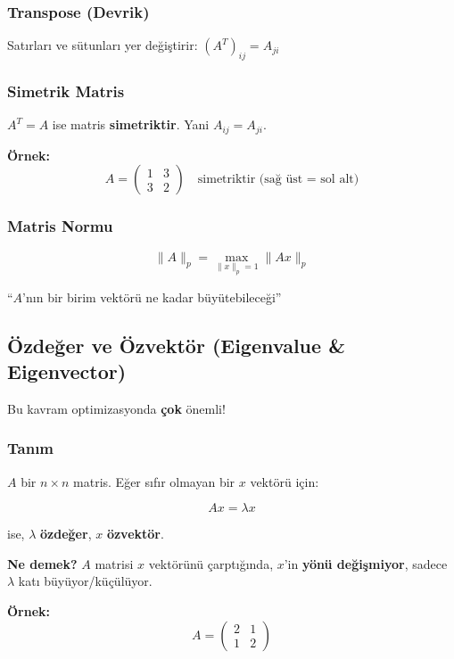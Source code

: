 \documentclass[12pt,a4paper]{article}
\theoremstyle{definition}
\theoremstyle{remark}
\begin{document}
\subsubsection{Transpose (Devrik)}
Sat{\i}rlar{\i} ve s\"utunlar{\i} yer de\u{g}i\c{s}tirir: $(A^T)_{ij} = A_{ji}$

\subsubsection{Simetrik Matris}
$A^T = A$ ise matris \textbf{simetriktir}. Yani $A_{ij} = A_{ji}$.

\textbf{\"Ornek:}
\[
A = \begin{pmatrix} 1 & 3 \\ 3 & 2 \end{pmatrix} \quad \text{simetriktir (sa\u{g} \"ust = sol alt)}
\]

\subsubsection{Matris Normu}

\[
\|A\|_p = \max_{\|x\|_p = 1} \|Ax\|_p
\]

``$A$'n{\i}n bir birim vekt\"or\"u ne kadar b\"uy\"utebilece\u{g}i''

\subsection{\"Ozde\u{g}er ve \"Ozvekt\"or (Eigenvalue \& Eigenvector)}

Bu kavram optimizasyonda \textbf{\c{c}ok} \"onemli!

\subsubsection{Tan{\i}m}
$A$ bir $n \times n$ matris. E\u{g}er s{\i}f{\i}r olmayan bir $x$ vekt\"or\"u i\c{c}in:

\[
Ax = \lambda x
\]

ise, $\lambda$ \textbf{\"ozde\u{g}er}, $x$ \textbf{\"ozvekt\"or}.

\textbf{Ne demek?} $A$ matrisi $x$ vekt\"or\"un\"u \c{c}arpt{\i}\u{g}{\i}nda, $x$'in \textbf{y\"on\"u de\u{g}i\c{s}miyor}, sadece $\lambda$ kat{\i} b\"uy\"uyor/k\"u\c{c}\"ul\"uyor.

\textbf{\"Ornek:}
\[
A = \begin{pmatrix} 2 & 1 \\ 1 & 2 \end{pmatrix}
\]
\end{document}
